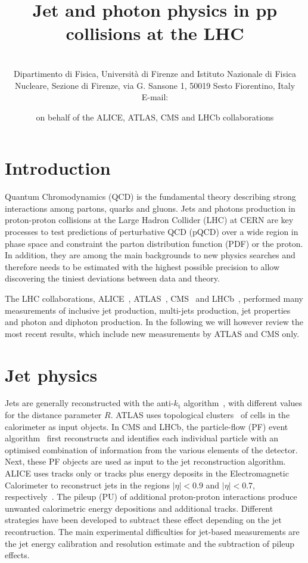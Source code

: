 \documentclass{PoS}
\title{Jet and photon physics in pp collisions at the LHC}
\author{\speaker{ Vitaliano Ciulli } %
\\ Dipartimento di Fisica, Universit\`a di Firenze and Istituto
Nazionale di Fisica Nucleare, Sezione di Firenze, via G. Sansone 1, 50019 Sesto Fiorentino, Italy \\ E-mail:
\email{vitaliano.ciulli@fi.infn.it}} \author{on behalf of the ALICE, ATLAS, CMS and LHCb collaborations}
\providecommand{\kts}{\ensuremath{k_{\mathrm{t}}}\xspace}
\begin{document}
\section{Introduction}

Quantum Chromodynamics (QCD) is the fundamental theory describing strong interactions among partons, \ie quarks and
gluons. Jets and photons production in proton-proton collisions at the Large Hadron Collider (LHC) at CERN are key processes to test predictions of
perturbative QCD (pQCD) over a wide region in phase space and constraint the parton distribution function (PDF) or the
proton. In addition, they are among the main backgrounds to new physics searches and therefore needs to be estimated with the
highest possible precision to allow discovering the tiniest deviations between data and theory.

The LHC collaborations, ALICE~\cite{Aamodt:2008zz}, ATLAS~\cite{Aad:2008zzm}, CMS~\cite{Chatrchyan:2008aa} and LHCb~\cite{Alves:2008zz}, performed many
measurements of inclusive jet production, multi-jets production, jet properties and photon and diphoton production. 
In the following we will however review the most recent results, which include new measurements by ATLAS and CMS only.  

\section{Jet physics}

Jets are generally reconstructed with the anti-\kts algorithm~\cite{Cacciari:2008gp}, with different values for the distance parameter $R$.
ATLAS uses topological clusters~\cite{Lampl:2008zz} of cells in the calorimeter as input objects. 
In CMS and LHCb, the particle-flow (PF) event
algorithm~\cite{CMS:2009nxa,Aaij:2013nxa} first reconstructs and identifies each individual particle with an optimised
combination of information from the various elements of the detector. Next, these PF objects are used as input to the jet
reconstruction algorithm. ALICE uses tracks only or tracks plus energy deposits
in the Electromagnetic Calorimeter to reconstruct jets in the regions
$|\eta|<0.9$ and $|\eta|<0.7$, respectively~\cite{Abelev:2013fn}.
The pileup (PU) of additional proton-proton interactions produce unwanted calorimetric energy depositions and additional
tracks. Different strategies have been developed to subtract these effect depending on the jet recontruction.
The main experimental difficulties for jet-based measurements are the jet energy calibration and resolution estimate and the subtraction of pileup
effects. 
\end{document}

